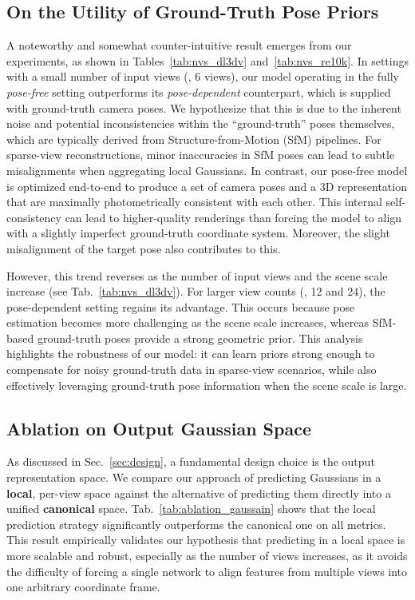 \subsection{On the Utility of Ground-Truth Pose Priors}
A noteworthy and somewhat counter-intuitive result emerges from our experiments, as shown in Tables~\ref{tab:nvs_dl3dv} and~\ref{tab:nvs_re10k}. In settings with a small number of input views (\eg, 6 views), our model operating in the fully \textit{pose-free} setting outperforms its \textit{pose-dependent} counterpart, which is supplied with ground-truth camera poses. We hypothesize that this is due to the inherent noise and potential inconsistencies within the ``ground-truth'' poses themselves, which are typically derived from Structure-from-Motion (SfM) pipelines.
For sparse-view reconstructions, minor inaccuracies in SfM poses can lead to subtle misalignments when aggregating local Gaussians. In contrast, our pose-free model is optimized end-to-end to produce a set of camera poses and a 3D representation that are maximally photometrically consistent with each other. This internal self-consistency can lead to higher-quality renderings than forcing the model to align with a slightly imperfect ground-truth coordinate system. Moreover, the slight misalignment of the target pose also contributes to this.

However, this trend reverses as the number of input views and the scene scale increase (see Tab.~\ref{tab:nvs_dl3dv}). For larger view counts (\eg, 12 and 24), the pose-dependent setting regains its advantage. This occurs because pose estimation becomes more challenging as the scene scale increases, whereas SfM-based ground-truth poses provide a strong geometric prior. This analysis highlights the robustness of our model: it can learn priors strong enough to compensate for noisy ground-truth data in sparse-view scenarios, while also effectively leveraging ground-truth pose information when the scene scale is large.


\subsection{Ablation on Output Gaussian Space}

As discussed in Sec.~\ref{sec:design}, a fundamental design choice is the output representation space. We compare our approach of predicting Gaussians in a \textbf{local}, per-view space against the alternative of predicting them directly into a unified \textbf{canonical} space. Tab.~\ref{tab:ablation_gaussain} shows that the local prediction strategy significantly outperforms the canonical one on all metrics. This result empirically validates our hypothesis that predicting in a local space is more scalable and robust, especially as the number of views increases, as it avoids the difficulty of forcing a single network to align features from multiple views into one arbitrary coordinate frame.

